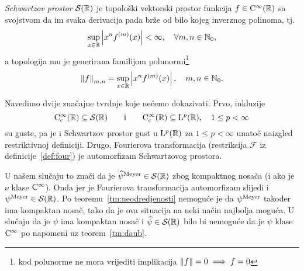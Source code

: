 \documentclass[main.tex]{subfiles}
\begin{document}
\begin{definicija}
	\emph{Schwartzov prostor} \( \mathcal S(\mathbb{R}) \) je topološki vektorski prostor
	funkcija \( f \in \mathrm{C}^\infty(\mathbb{R}) \) sa svojstvom da im svaka derivacija pada brže od bilo kojeg
	inverznog polinoma, tj.\
	\begin{equation}
		\sup_{x \in \mathbb{R}} \left| {x^n f^{(m)}(x)} \right| < \infty, \quad \forall m,n \in \mathbb{N}_0,
	\end{equation}
	a topologija mu je generirana familijom polunormi\footnote{kod polunorme ne mora vrijediti implikacija \( \left\lVert f\right\rVert = 0 \implies f = 0 \)}
	\begin{equation}
		\left\lVert f\right\rVert_{m,n} = \sup_{x \in \mathbb{R}} \left| {x^n f^{(m)}(x)} \right|, \quad m,n \in \mathbb{N}_0.
	\end{equation}
\end{definicija}

Navedimo dvije značajne tvrdnje koje nećemo dokazivati. Prvo, inkluzije
\begin{equation}
	\mathrm{C}^\infty_{\mathrm{c}}(\mathbb{R}) \subseteq \mathcal S(\mathbb{R})
	\qquad \text i \qquad
	\mathrm{C}^\infty_{\mathrm{c}}(\mathbb{R}) \subseteq \mathrm{L}^p(\mathbb{R}), \quad 1 \le p < \infty
\end{equation}
su guste, pa je i Schwartzov prostor gust u \( \mathrm{L}^p(\mathbb{R}) \) za \( 1 \le p < \infty \)
unatoč naizgled restriktivnoj definiciji. Drugo, Fourierova transformacija (restrikcija \( \mathcal F \)
iz definicije~\ref{def:four})
je automorfizam Schwartzovog prostora.

U našem slučaju to znači da je \( \widehat{\psi}^{\mathrm{Meyer}} \in \mathcal S(\mathbb{R}) \)
zbog kompaktnog nosača (i ako je \( \nu \) klase \( \mathrm{C}^\infty \)).
Onda jer je Fourierova transformacija automorfizam slijedi
i \( \psi^{\mathrm{Meyer}} \in \mathcal S(\mathbb{R}) \). Po teoremu~\ref{tm:neodredjenosti}
nemoguće je da \( \psi^{\mathrm{Meyer}} \) također ima kompaktan nosač, tako da je ova situacija
na neki način najbolja moguća. U slučaju da je \( \psi \) ima kompaktan nosač
i \( \widehat{\psi} \in \mathcal S(\mathbb{R}) \) bilo bi nemoguće da je
\( \psi \) klase \( \mathrm{C}^\infty \)
po napomeni uz teorem~\ref{tm:daub}.
\end{document}
